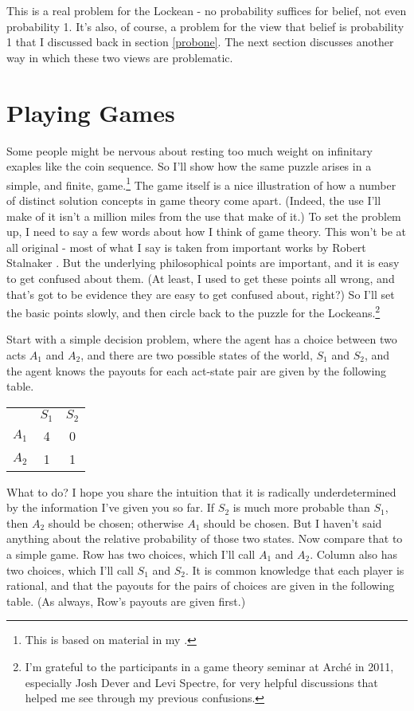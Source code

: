 \documentclass[11pt,]{book}
\let\rmarkdownfootnote\footnote%
\def\footnote{\protect\rmarkdownfootnote}
\def\toprule{}
\def\bottomrule{}
\begin{document}
This is a real problem for the Lockean - no probability suffices for belief, not even probability 1. It's also, of course, a problem for the view that belief is probability 1 that I discussed back in section \ref{probone}. The next section discusses another way in which these two views are problematic.

\hypertarget{lockegames}{%
\section{Playing Games}\label{lockegames}}

Some people might be nervous about resting too much weight on infinitary exaples like the coin sequence. So I'll show how the same puzzle arises in a simple, and finite, game.\footnote{This is based on material in my \citeyearpar[sect. 1]{Weatherson2014}.} The game itself is a nice illustration of how a number of distinct solution concepts in game theory come apart. (Indeed, the use I'll make of it isn't a million miles from the use that \citet{KohlbergMertens1986} make of it.) To set the problem up, I need to say a few words about how I think of game theory. This won't be at all original - most of what I say is taken from important works by Robert Stalnaker \citetext{\citeyear{Stalnaker1994}; \citeyear{Stalnaker1996}; \citeyear{Stalnaker1998}; \citeyear{Stalnaker1999}}. But the underlying philosophical points are important, and it is easy to get confused about them. (At least, I used to get these points all wrong, and that's got to be evidence they are easy to get confused about, right?) So I'll set the basic points slowly, and then circle back to the puzzle for the Lockeans.\footnote{I'm grateful to the participants in a game theory seminar at Arché in 2011, especially Josh Dever and Levi Spectre, for very helpful discussions that helped me see through my previous confusions.}

Start with a simple decision problem, where the agent has a choice between two acts \(A_1\) and \(A_2\), and there are two possible states of the world, \(S_1\) and \(S_2\), and the agent knows the payouts for each act-state pair are given by the following table.

\begin{longtable}[]{@{}lcc@{}}
\toprule
\endhead
& \(S_1\) & \(S_2\)\tabularnewline
\(A_1\) & 4 & 0\tabularnewline
\(A_2\) & 1 & 1\tabularnewline
\bottomrule
\end{longtable}

What to do? I hope you share the intuition that it is radically underdetermined by the information I've given you so far. If \(S_2\) is much more probable than \(S_1\), then \(A_2\) should be chosen; otherwise \(A_1\) should be chosen. But I haven't said anything about the relative probability of those two states. Now compare that to a simple game. Row has two choices, which I'll call \(A_1\) and \(A_2\). Column also has two choices, which I'll call \(S_1\) and \(S_2\). It is common knowledge that each player is rational, and that the payouts for the pairs of choices are given in the following table. (As always, Row's payouts are given first.)
\end{document}
